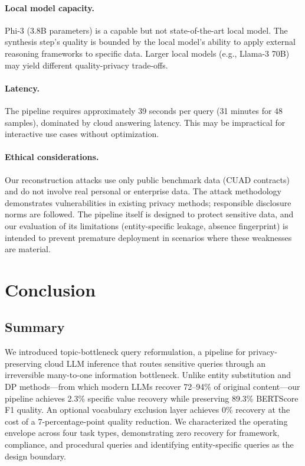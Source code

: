 \documentclass[sigconf,anonymous,review,balance=false]{acmart}
\begin{document}
\paragraph{Local model capacity.} Phi-3 (3.8B parameters) is a capable but not state-of-the-art local model. The synthesis step's quality is bounded by the local model's ability to apply external reasoning frameworks to specific data. Larger local models (e.g., Llama-3 70B) may yield different quality-privacy trade-offs.

\paragraph{Latency.} The pipeline requires approximately 39 seconds per query (31 minutes for 48 samples), dominated by cloud answering latency. This may be impractical for interactive use cases without optimization.

\paragraph{Ethical considerations.} Our reconstruction attacks use only public benchmark data (CUAD contracts) and do not involve real personal or enterprise data. The attack methodology demonstrates vulnerabilities in existing privacy methods; responsible disclosure norms are followed. The pipeline itself is designed to protect sensitive data, and our evaluation of its limitations (entity-specific leakage, absence fingerprint) is intended to prevent premature deployment in scenarios where these weaknesses are material.

\section{Conclusion}
\label{sec:conclusion}

\subsection{Summary}
\label{sec:summary}

We introduced topic-bottleneck query reformulation, a pipeline for privacy-preserving cloud LLM inference that routes sensitive queries through an irreversible many-to-one information bottleneck. Unlike entity substitution and DP methods---from which modern LLMs recover 72--94\% of original content---our pipeline achieves 2.3\% specific value recovery while preserving 89.3\% BERTScore F1 quality. An optional vocabulary exclusion layer achieves 0\% recovery at the cost of a 7-percentage-point quality reduction. We characterized the operating envelope across four task types, demonstrating zero recovery for framework, compliance, and procedural queries and identifying entity-specific queries as the design boundary.
\end{document}
